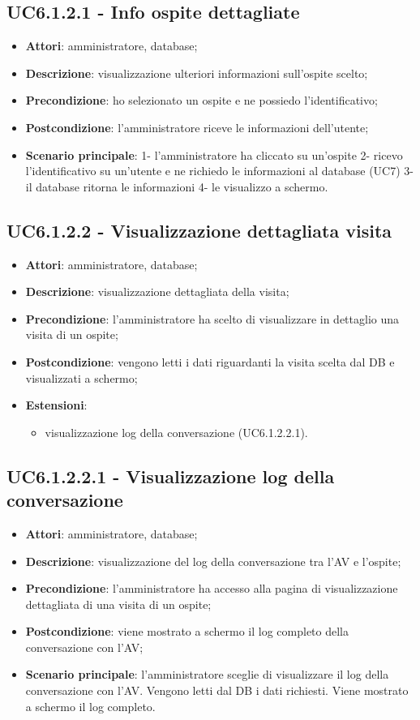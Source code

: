\documentclass[../AnalisiDeiRequisiti.tex]{subfiles}
\begin{document}
\subsection{UC6.1.2.1 - Info ospite dettagliate} 
\label{sssec:UC6.1.2.1} 
\begin{itemize} 
\item \textbf{Attori}: amministratore, database;
\item \textbf{Descrizione}: visualizzazione ulteriori informazioni sull'ospite scelto;
\item \textbf{Precondizione}: ho selezionato un ospite e ne possiedo l'identificativo;
\item \textbf{Postcondizione}: l'amministratore riceve le informazioni dell'utente;
\item \textbf{Scenario principale}: 1- l'amministratore ha cliccato su un'ospite
2- ricevo l'identificativo su un'utente e ne richiedo le informazioni al database (UC7)
3- il database ritorna le informazioni
4- le visualizzo a schermo.\end{itemize} 
\subsection{UC6.1.2.2 - Visualizzazione dettagliata visita} 
\label{sssec:UC6.1.2.2} 
\begin{itemize} 
\item \textbf{Attori}: amministratore, database;
\item \textbf{Descrizione}: visualizzazione dettagliata della visita;
\item \textbf{Precondizione}: l'amministratore ha scelto di visualizzare in dettaglio una visita di un ospite;
\item \textbf{Postcondizione}: vengono letti i dati riguardanti la visita scelta dal DB e visualizzati a schermo;
\item \textbf{Estensioni}:\begin{itemize}\item visualizzazione log della conversazione (UC6.1.2.2.1).\end{itemize}
\end{itemize} 
\subsection{UC6.1.2.2.1 - Visualizzazione log della conversazione} 
\label{sssec:UC6.1.2.2.1} 
\begin{itemize} 
\item \textbf{Attori}: amministratore, database;
\item \textbf{Descrizione}: visualizzazione del log della conversazione tra l'AV e l'ospite;
\item \textbf{Precondizione}: l'amministratore ha accesso alla pagina di visualizzazione dettagliata di una visita di un ospite;
\item \textbf{Postcondizione}: viene mostrato a schermo il log completo della conversazione con l'AV;
\item \textbf{Scenario principale}: l'amministratore sceglie di visualizzare il log della conversazione con l'AV. Vengono letti dal DB i dati richiesti. Viene mostrato a schermo il log completo.\end{itemize} 
\end{document}
